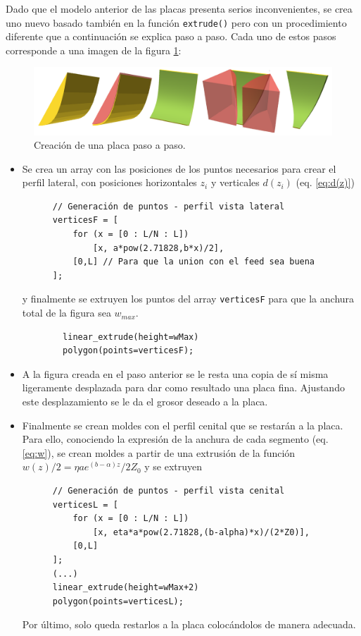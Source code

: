 \documentclass[11pt,a4paper,twoside,pdf]{article}
\numberwithin{equation}{section}
\begin{document}
Dado que el modelo anterior de las placas presenta serios inconvenientes, se crea uno nuevo basado también en la función \texttt{extrude()} pero con un procedimiento diferente que a continuación se explica paso a paso. Cada uno de estos pasos corresponde a una imagen de la figura \ref{fig:placasCurvas}:
\begin{figure}[!h]
    \centering
    \includegraphics[width=\linewidth]{img/modelos/2025_02_21-ExtrudeFunctYSuavizado/placasCurvas.png}
    \vspace{-0.5cm}
    \caption{Creación de una placa paso a paso.}
    \label{fig:placasCurvas}
\end{figure}
\begin{itemize}
    \item[1.] Se crea un array con las posiciones de los puntos necesarios para crear el perfil lateral, con posiciones horizontales $z_i$ y verticales $d(z_i)$ (eq. \ref{eq:d(z)})
    \begin{verbatim}
      // Generación de puntos - perfil vista lateral
      verticesF = [
          for (x = [0 : L/N : L])
              [x, a*pow(2.71828,b*x)/2],
          [0,L] // Para que la union con el feed sea buena
      ];
    \end{verbatim}
    y finalmente se extruyen los puntos del array \texttt{verticesF} para que la anchura total de la figura sea $w_{max}$.
    \begin{verbatim}
        linear_extrude(height=wMax)
        polygon(points=verticesF);
    \end{verbatim}

    \item[2 y 3.] A la figura creada en el paso anterior se le resta una copia de sí misma ligeramente desplazada para dar como resultado una placa fina. Ajustando este desplazamiento se le da el grosor deseado a la placa.

    \item[4 y 5.] Finalmente se crean moldes con el perfil cenital que se restarán a la placa. Para ello, conociendo la expresión de la anchura de cada segmento (eq. \ref{eq:w}), se crean moldes a partir de una extrusión de la función $w(z)/2=\eta a e^{(b-\alpha)z}/2Z_0$ y se extruyen
    \begin{verbatim}
      // Generación de puntos - perfil vista cenital
      verticesL = [
          for (x = [0 : L/N : L])
              [x, eta*a*pow(2.71828,(b-alpha)*x)/(2*Z0)],
          [0,L]
      ];
      (...)
      linear_extrude(height=wMax+2)
      polygon(points=verticesL);      
    \end{verbatim}
    Por último, solo queda restarlos a la placa colocándolos de manera adecuada.
\end{itemize}
\end{document}
